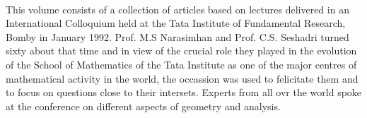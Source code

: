 ~\thispagestyle{empty}

This volume consists of a collection of articles based on lectures delivered in an International Colloquium held at the Tata Institute of Fundamental Research, Bomby in January 1992. Prof. M.S Narasimhan and Prof. C.S. Seshadri turned sixty about that time and in view of the crucial role they played in the evolution of the School of Mathematics of the Tata Institute as one of the major centres of mathematical activity in the world, the occassion was used to felicitate them and to focus on questions close to their intersets. Experts from all ovr the world spoke at the conference on different aspects of geometry and analysis.
